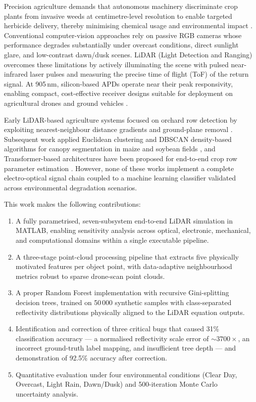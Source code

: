\documentclass[12pt,a4paper]{article}
\begin{document}
Precision agriculture demands that autonomous machinery discriminate crop plants from
invasive weeds at centimetre-level resolution to enable targeted herbicide delivery,
thereby minimising chemical usage and environmental impact \cite{karim2024}.
Conventional computer-vision approaches rely on passive RGB cameras whose performance
degrades substantially under overcast conditions, direct sunlight glare, and low-contrast
dawn/dusk scenes.  LiDAR (Light Detection and Ranging) overcomes these limitations by
actively illuminating the scene with pulsed near-infrared laser pulses and measuring
the precise time of flight (ToF) of the return signal.  At 905\,nm, silicon-based APDs
operate near their peak responsivity, enabling compact, cost-effective receiver designs
suitable for deployment on agricultural drones and ground vehicles \cite{luo2024}.

Early LiDAR-based agriculture systems focused on orchard row detection by exploiting
nearest-neighbour distance gradients and ground-plane removal \cite{bell2016}.
Subsequent work applied Euclidean clustering and DBSCAN density-based algorithms for
canopy segmentation in maize and soybean fields \cite{zhang2022,yang2024}, and
Transformer-based architectures have been proposed for end-to-end crop row parameter
estimation \cite{guo2024}.  However, none of these works implement a complete
electro-optical signal chain coupled to a machine learning classifier validated across
environmental degradation scenarios.

This work makes the following contributions:
\begin{enumerate}[label=(\arabic*)]
    \item A fully parametrised, seven-subsystem end-to-end LiDAR simulation in MATLAB,
          enabling sensitivity analysis across optical, electronic, mechanical, and
          computational domains within a single executable pipeline.
    \item A three-stage point-cloud processing pipeline that extracts five physically
          motivated features per object point, with data-adaptive neighbourhood
          metrics robust to sparse drone-scan point clouds.
    \item A proper Random Forest implementation with recursive Gini-splitting decision
          trees, trained on 50\,000 synthetic samples with class-separated reflectivity
          distributions physically aligned to the LiDAR equation outputs.
    \item Identification and correction of three critical bugs that caused 31\%
          classification accuracy --- a normalised reflectivity scale error of ${\sim}3700\times$,
          an incorrect ground-truth label mapping, and insufficient tree depth --- and
          demonstration of 92.5\% accuracy after correction.
    \item Quantitative evaluation under four environmental conditions (Clear Day,
          Overcast, Light Rain, Dawn/Dusk) and 500-iteration Monte Carlo uncertainty
          analysis.
\end{enumerate}
\end{document}
